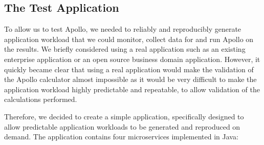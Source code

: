 \subsection{The Test Application}

To allow us to test Apollo, we needed to reliably and reproducibly generate application workload that we could monitor, collect data for and run Apollo on the results.  We briefly considered using a real application such as an existing enterprise application or an open source business domain application.  However, it quickly became clear that using a real application would make the validation of the Apollo calculator almost impossible as it would be very difficult to make the application workload highly predictable and repeatable, to allow validation of the calculations performed.

Therefore, we decided to create a simple application, specifically designed to allow predictable application workloads to be generated and reproduced on demand.  The application contains four microservices implemented in Java:


